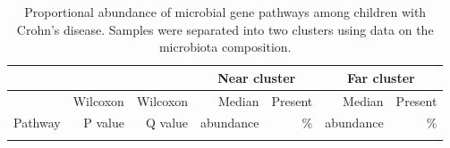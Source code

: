 \newpage
{\scriptsize
	\renewcommand{\arraystretch}{0.8} \setlength{\tabcolsep}{1pt}
	\begin{longtable}{ | l | r | r | r | r | r | r  | }
		\caption[Proportional abundance of microbial gene pathways among children with Crohn's disease]{Proportional abundance of microbial gene pathways among children with Crohn's disease. Samples were separated into two clusters using data on the microbiota composition.} 
		\label{TS5} \\
		
		\hline
		\multicolumn{3}{|c|}{} & \multicolumn{2}{c}{Near cluster}
		& \multicolumn{2}{|c|}{Far cluster}\\
		\hline 
		& Wilcoxon & Wilcoxon & Median& Present & Median &  Present\\ 
		Pathway & P value & Q value & abundance & \% & abundance & \% \\ 
		\hline 
		\endfirsthead
		
		
		\endfoot
		
		\hline 
		\endlastfoot
		
		
		

\end{longtable}}
